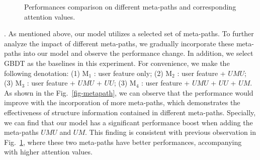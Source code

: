 \begin{figure}[t]
\centering
{}
\caption{Performances comparison on different meta-paths and corresponding attention values.\label{fig-att_val}}
\end{figure}
.
As mentioned above, our model utilizes a selected set of meta-paths. To further analyze the impact of different meta-paths, we gradually incorporate  these meta-paths into our model and observe the performance change. In addition, we select GBDT as the baselines in this experiment. For convenience, we make the following denotation: (1) M$_1$ : user feature only; (2) M$_2$ : user feature + $UMU$; (3) M$_3$ : user feature + $UMU$ + $UU$; (3) M$_4$ : user feature + $UMU$ + $UU$ + $UM$.
As shown in the Fig.~\ref{fig-metapath}, we can observe that the performance would improve with the incorporation of more meta-paths, which demonstrates the effectiveness of structure information contained in different meta-paths. Specially, we can find that our model has a significant performance boost when adding the meta-paths $UMU$ and $UM$. This finding is consistent with previous observation in Fig.~\ref{fig-att_val}, where these two meta-paths have better performances, accompanying with higher attention values.


